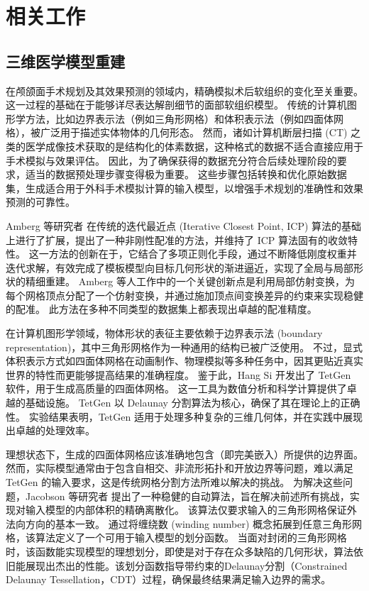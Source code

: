 
\chapter{相关工作}
\label{cha:related-work}

\section{三维医学模型重建}

在颅颌面手术规划及其效果预测的领域内，精确模拟术后软组织的变化至关重要。
这一过程的基础在于能够详尽表达解剖细节的面部软组织模型。
传统的计算机图形学方法，比如边界表示法（例如三角形网格）和体积表示法（例如四面体网格），被广泛用于描述实体物体的几何形态。
然而，诸如计算机断层扫描 (CT) 之类的医学成像技术获取的是结构化的体素数据，这种格式的数据不适合直接应用于手术模拟与效果评估。
因此，为了确保获得的数据充分符合后续处理阶段的要求，适当的数据预处理步骤变得极为重要。
这些步骤包括转换和优化原始数据集，生成适合用于外科手术模拟计算的输入模型，以增强手术规划的准确性和效果预测的可靠性。

Amberg 等研究者 \cite{ambergOptimalStepNonrigid2007} 在传统的迭代最近点 (Iterative Closest Point, ICP) 算法的基础上进行了扩展，提出了一种非刚性配准的方法，并维持了 ICP 算法固有的收敛特性。
这一方法的创新在于，它结合了多项正则化手段，通过不断降低刚度权重并迭代求解，有效完成了模板模型向目标几何形状的渐进逼近，实现了全局与局部形状的精细重建。
Amberg 等人工作中的一个关键创新点是利用局部仿射变换，为每个网格顶点分配了一个仿射变换，并通过施加顶点间变换差异的约束来实现稳健的配准。
此方法在多种不同类型的数据集上都表现出卓越的配准精度。

在计算机图形学领域，物体形状的表征主要依赖于边界表示法 (boundary representation)，其中三角形网格作为一种通用的结构已被广泛使用。
不过，显式体积表示方式如四面体网格在动画制作、物理模拟等多种任务中，因其更贴近真实世界的特性而更能够提高结果的准确程度。
鉴于此，Hang Si \cite{siTetGenDelaunaybasedQuality2015} 开发出了 TetGen 软件，用于生成高质量的四面体网格。
这一工具为数值分析和科学计算提供了卓越的基础设施。
TetGen 以 Delaunay 分割算法为核心，确保了其在理论上的正确性。
实验结果表明，TetGen 适用于处理多种复杂的三维几何体，并在实践中展现出卓越的处理效率。

理想状态下，生成的四面体网格应该准确地包含（即完美嵌入）所提供的边界面。
然而，实际模型通常由于包含自相交、非流形拓扑和开放边界等问题，难以满足 TetGen 的输入要求，这是传统网格分割方法所难以解决的挑战。
为解决这些问题，Jacobson 等研究者 \cite{jacobsonRobustInsideoutsideSegmentation2013} 提出了一种稳健的自动算法，旨在解决前述所有挑战，实现对输入模型的内部体积的精确离散化。
该算法仅要求输入的三角形网格保证外法向方向的基本一致。
通过将缠绕数 (winding number) 概念拓展到任意三角形网格，该算法定义了一个可用于输入模型的划分函数。
当面对封闭的三角形网格时，该函数能实现模型的理想划分，即使是对于存在众多缺陷的几何形状，算法依旧能展现出杰出的性能。该划分函数指导带约束的Delaunay分割（Constrained Delaunay Tessellation，CDT）过程，确保最终结果满足输入边界的需求。


